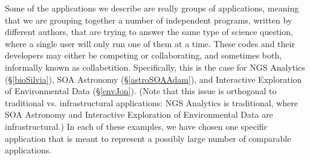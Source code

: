 

Some of the applications we describe are really groups of
applications, meaning that we are grouping together a number of
independent programs, written by different authors, that are trying to
answer the same type of science question, where a single user
will only run one of them at a time.  %
These codes and their developers may either be
competing or collaborating, and sometimes both, informally known as
collabetition. Specifically, this is the case for NGS Analytics
(\S\ref{bioSilvia}), SOA Astronomy (\S\ref{astroSOAAdam}), and
Interactive Exploration of Environmental Data (\S\ref{envJon}).  (Note
that this issue is orthogonal to traditional vs. infrastructural applications:
NGS Analytics is traditional, where SOA Astronomy and Interactive
Exploration of Environmental Data are infrastructural.)  In
each of these examples, we have chosen one specific application that
is meant to represent a possibly large number of comparable
applications.

